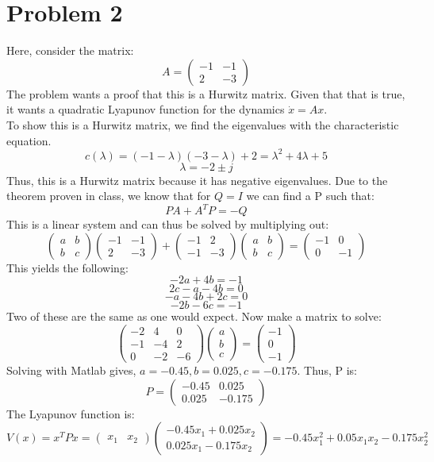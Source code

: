 \documentclass{article}
\begin{document}
\section*{Problem 2}
Here, consider the matrix:
\[A=\begin{pmatrix}-1 & -1\\2 & -3\end{pmatrix}\]
The problem wants a proof that this is a Hurwitz matrix. Given that that is true, it wants a quadratic Lyapunov function for the dynamics $\dot{x}=Ax$.\\
To show this is a Hurwitz matrix, we find the eigenvalues with the characteristic equation.
\[c(\lambda)=(-1-\lambda)(-3-\lambda)+2=\lambda^2+4\lambda+5\]
\[\lambda=-2\pm j\]
Thus, this is a Hurwitz matrix because it has negative eigenvalues. Due to the theorem proven in class, we know that for $Q=I$ we can find a P such that:
\[PA+A^TP=-Q\]
This is a linear system and can thus be solved by multiplying out:
\[\begin{pmatrix}a &b\\b&c\end{pmatrix}\begin{pmatrix}-1 &-1\\2 &-3\end{pmatrix}+\begin{pmatrix}-1 & 2\\-1&-3\end{pmatrix}\begin{pmatrix}a &b\\b&c\end{pmatrix}=\begin{pmatrix}-1 & 0\\0&-1\end{pmatrix}\]
This yields the following:
\[-2a+4b=-1\]
\[2c-a-4b=0\]
\[-a-4b+2c=0\]
\[-2b-6c=-1\]
Two of these are the same as one would expect. Now make a matrix to solve:
\[\begin{pmatrix}-2 &4 &0\\-1& -4&2\\0 &-2&-6\end{pmatrix}\begin{pmatrix}a\\b\\c\end{pmatrix}=\begin{pmatrix}-1\\0\\-1\end{pmatrix}\]
Solving with Matlab gives, $a=-0.45,b=0.025,c=-0.175$. Thus, P is:
\[P=\begin{pmatrix}-0.45 & 0.025\\0.025 & -0.175\end{pmatrix}\]
The Lyapunov function is:
\[V(x)=x^TPx=\begin{pmatrix}x_1&x_2\end{pmatrix}\begin{pmatrix}-0.45x_1+0.025x_2\\0.025x_1-0.175x_2\end{pmatrix}=-0.45x_1^2+0.05x_1x_2-0.175x_2^2\]
\end{document}
